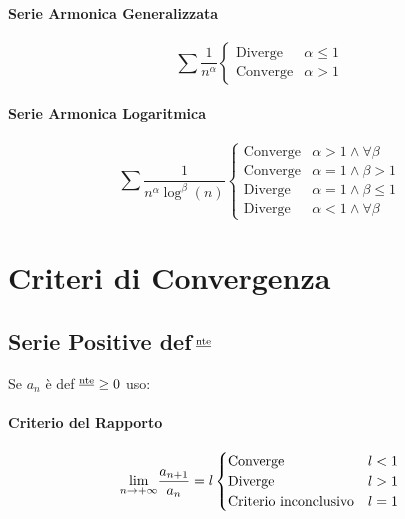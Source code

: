 \documentclass[12pt, a4paper, openany]{book}
\begin{document}
\paragraph*{Serie Armonica Generalizzata}
\begin{equation*}
	\sum \frac{1}{n^\alpha} \begin{cases}
		\text{Diverge}  & \alpha\leq 1 \\
		\text{Converge} & \alpha> 1
	\end{cases}
\end{equation*}

\paragraph*{Serie Armonica Logaritmica}
\begin{equation*}
	\sum \frac{1}{n^\alpha \log^\beta(n)}
	\begin{cases}
		\text{Converge} & \alpha > 1 \wedge \forall \beta \\
		\text{Converge} & \alpha = 1 \wedge \beta > 1     \\
		\text{Diverge}  & \alpha = 1 \wedge \beta \leq 1  \\
		\text{Diverge}  & \alpha < 1 \wedge \forall \beta
	\end{cases}
\end{equation*}


\section{Criteri di Convergenza}


\subsection*{Serie Positive def$^{\text{ \underline{nte}}}$}
Se $a_n$ è def$^{\text{ \underline{nte}}} \geq 0$ uso:
\paragraph*{Criterio del Rapporto} 
\[
	\underset{n \to +\infty}{\lim} \frac{a_{n+1}}{a_n} = l
	\begin{cases}
		\text{Converge} &  l<1\\
		\text{Diverge} & l>1\\
		\text{Criterio inconclusivo} & l=1
	\end{cases}
\]
\end{document}

